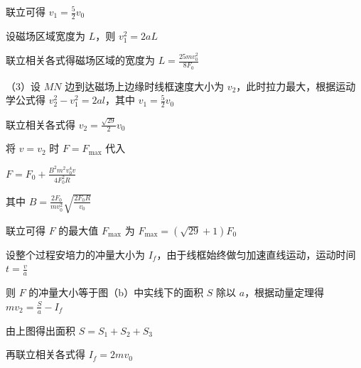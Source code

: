 \documentclass[\gkver]{gaokaozhenti}
\begin{document}
\begin{enumerate}
{联立可得 $v_{1}=\frac{5}{2}v_{0}$

设磁场区域宽度为 $L$，则 $v_{1}^{2}=2aL$

联立相关各式得磁场区域的宽度为 $L=\frac{25mv_{0}^{2}}{8F_{0}}$

（3）设 $MN$ 边到达磁场上边缘时线框速度大小为 $v_{2}$，此时拉力最大，根据运动学公式得 $v_{2}^{2}-v_{1}^{2}=2al$，其中 $v_{1}=\frac{5}{2}v_{0}$

联立相关各式得 $v_{2}=\frac{\sqrt{29}}{2}v_{0}$

将 $v=v_{2}$ 时 $F=F_{\max}$ 代入

$F=F_{0}+\frac{B^{2}m^{2}v_{0}^{4}v}{4F_{0}^{2}R}$

其中 $B=\frac{2F_{0}}{mv_{0}^{2}}\sqrt{\frac{2F_{0}R}{v_{0}}}$

联立可得 $F$ 的最大值 $F_{\max}$ 为 $F_{\max}=(\sqrt{29}+1)F_{0}$

设整个过程安培力的冲量大小为 $I_{f}$，由于线框始终做匀加速直线运动，运动时间 $t=\frac{v}{a}$

则 $F$ 的冲量大小等于图（b）中实线下的面积 $S$ 除以 $a$，根据动量定理得 $mv_{2}=\frac{S}{a}-I_{f}$


由上图得出面积 $S=S_{1}+S_{2}+S_{3}$

再联立相关各式得 $I_{f}=2mv_{0}$
}

\end{enumerate}
\end{document}
